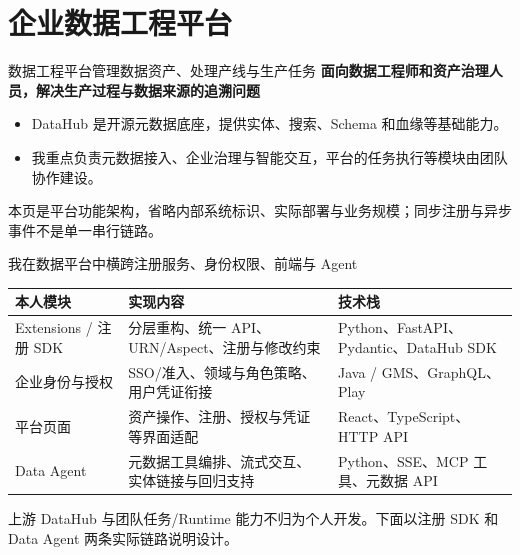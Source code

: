 \documentclass[aspectratio=169,10pt]{beamer}
\newcommand{\src}[1]{\vfill{\fontsize{6.7}{8}\selectfont\color{Muted}#1}\par}
\newcommand{\lead}[1]{{\color{Teal}\large\bfseries #1}\par\medskip}
\begin{document}
\section{企业数据工程平台}
\begin{frame}{数据工程平台管理数据资产、处理产线与生产任务}
\lead{面向数据工程师和资产治理人员，解决生产过程与数据来源的追溯问题}
\begin{center}
\end{center}
\begin{itemize}
\item DataHub 是开源元数据底座，提供实体、搜索、Schema 和血缘等基础能力。
\item 我重点负责元数据接入、企业治理与智能交互，平台的任务执行等模块由团队协作建设。
\end{itemize}
\src{本页是平台功能架构，省略内部系统标识、实际部署与业务规模；同步注册与异步事件不是单一串行链路。}
\end{frame}

\begin{frame}{我在数据平台中横跨注册服务、身份权限、前端与 Agent}
\renewcommand{\arraystretch}{1.5}
\begin{tabularx}{\textwidth}{@{}p{2.7cm}Yp{3.4cm}@{}}
\toprule 本人模块 & 实现内容 & 技术栈 \\
\midrule
Extensions / 注册 SDK & 分层重构、统一 API、URN/Aspect、注册与修改约束 & Python、FastAPI、\mbox{Pydantic}、DataHub SDK \\
企业身份与授权 & SSO/准入、领域与角色策略、用户凭证衔接 & Java / GMS、GraphQL、Play \\
平台页面 & 资产操作、注册、授权与凭证等界面适配 & React、TypeScript、HTTP API \\
Data Agent & 元数据工具编排、流式交互、实体链接与回归支持 & Python、SSE、MCP 工具、元数据 API \\
\bottomrule
\end{tabularx}
\src{上游 DataHub 与团队任务/Runtime 能力不归为个人开发。下面以注册 SDK 和 Data Agent 两条实际链路说明设计。}
\end{frame}
\end{document}
